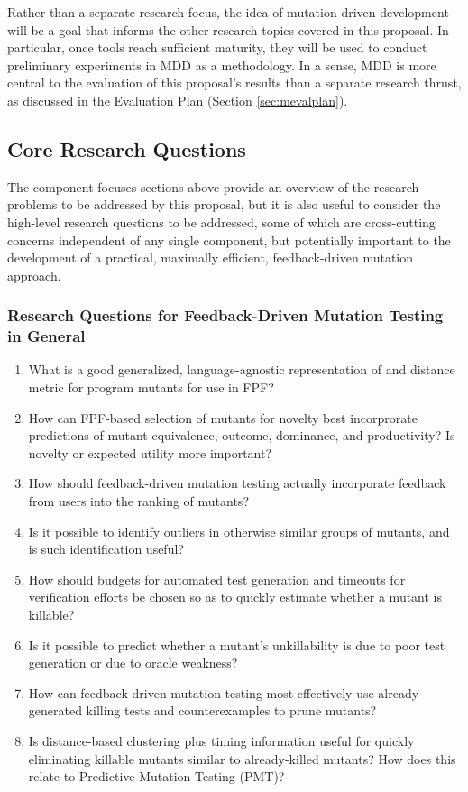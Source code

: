 Rather than a separate research focus, the idea of
mutation-driven-development will be a goal that informs the other
research topics covered in this proposal.  In particular, once tools
reach sufficient maturity, they will be used to conduct preliminary
experiments in MDD as a methodology.  In a sense, MDD is more central
to the evaluation of this proposal's results than a separate research
thrust, as discussed in the Evaluation Plan (Section \ref{sec:mevalplan}).

\subsection{Core Research Questions}

The component-focuses sections above provide an overview of the
research problems to be addressed by this proposal, but it is also
useful to consider the high-level research questions to be addressed,
some of which are cross-cutting concerns independent of any single
component, but potentially important to the development of a
practical, maximally efficient, feedback-driven mutation approach.

\subsubsection{Research Questions for Feedback-Driven Mutation Testing
in General}

\begin{enumerate}
\item What is a good generalized, language-agnostic representation
  of and distance metric for program mutants for use in FPF?
\item How can FPF-based selection of mutants for novelty best incorprorate
  predictions of mutant equivalence, outcome, dominance, and
  productivity?  Is novelty or expected utility more important?
\item How should feedback-driven mutation testing actually incorporate feedback from users into the 
  ranking of mutants? 
\item Is it possible to identify outliers in otherwise similar groups of
  mutants, and is such identification useful?
\item How should budgets for automated test generation and
  timeouts for verification efforts be chosen so as to quickly estimate whether a
  mutant is killable?
\item Is it possible to predict whether a mutant's unkillability is due to poor test 
  generation  or due to oracle weakness? 
\item How can feedback-driven mutation testing most effectively use already generated killing tests
  and counterexamples to prune mutants?
\item Is distance-based clustering plus timing information useful for quickly
  eliminating killable mutants similar to already-killed mutants?  How
  does this relate to Predictive Mutation Testing (PMT)?

\end{enumerate}


